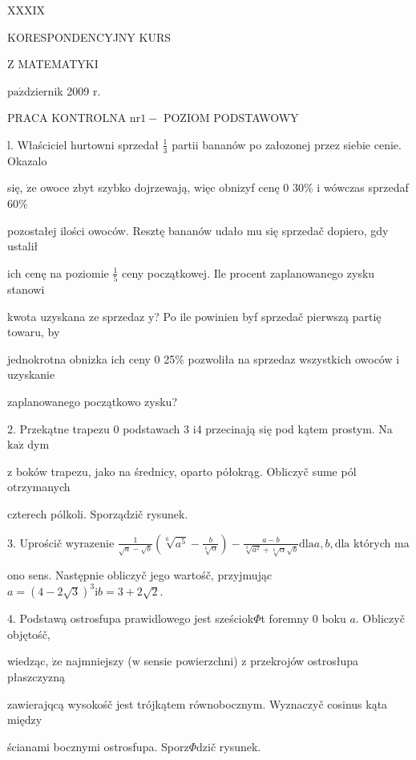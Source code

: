 \documentclass[a4paper,12pt]{article}
\begin{document}
XXXIX

KORESPONDENCYJNY KURS

Z MATEMATYKI

$\mathrm{p}\mathrm{a}\acute{\mathrm{z}}$dziernik 2009 $\mathrm{r}.$

PRACA KONTROLNA $\mathrm{n}\mathrm{r} 1-$ POZIOM PODSTAWOWY

l. Właściciel hurtowni sprzedał $\displaystyle \frac{1}{3}$ partii bananów po załozonej przez siebie cenie. Okazalo

się, $\dot{\mathrm{z}}\mathrm{e}$ owoce zbyt szybko dojrzewają, więc obnizyf cenę $0$ 30\% $\mathrm{i}$ wówczas sprzedaf 60\%

pozostałej ilości owoców. Resztę bananów udało mu się sprzedač dopiero, gdy ustalił

ich cenę na poziomie $\displaystyle \frac{1}{5}$ ceny początkowej. Ile procent zaplanowanego zysku stanowi

kwota uzyskana ze sprzedaz $\mathrm{y}$? Po ile powinien byf sprzedač pierwszą partię towaru, by

jednokrotna obnizka ich ceny $0$ 25\% pozwoliła na sprzedaz wszystkich owoców $\mathrm{i}$ uzyskanie

zaplanowanego początkowo zysku?

2. Przekątne trapezu $0$ podstawach 3 $\mathrm{i}4$ przecinają się pod kątem prostym. Na $\mathrm{k}\mathrm{a}\dot{\mathrm{z}}$ dym

$\mathrm{z}$ boków trapezu, jako na średnicy, oparto półokrąg. Obliczyč sume pól otrzymanych

czterech pólkoli. Sporządzič rysunek.

3. Uprościč wyrazenie $\displaystyle \frac{1}{\sqrt{a}-\sqrt{b}}(\sqrt[6]{a^{5}}-\frac{b}{\sqrt[6]{\alpha}}) -\displaystyle \frac{a-b}{\sqrt[3]{a^{2}}+\sqrt[6]{\alpha}\sqrt{b}} \mathrm{d}\mathrm{l}\mathrm{a}a, b, \mathrm{d}\mathrm{l}\mathrm{a}$ których ma

ono sens. Następnie obliczyč jego wartośč, przyjmując $a=(4-2\sqrt{3})^{3}\mathrm{i} b=3+2\sqrt{2}.$

4. Podstawą ostrosfupa prawidlowego jest sześciok$\Phi$t foremny $0$ boku $a$. Obliczyč objętośč,

wiedząc, $\dot{\mathrm{z}}\mathrm{e}$ najmniejszy ($\mathrm{w}$ sensie powierzchni) $\mathrm{z}$ przekrojów ostrosłupa płaszczyzną

zawierajqcą wysokośč jest trójkątem równobocznym. Wyznaczyč cosinus kąta między

ścianami bocznymi ostrosfupa. Sporz$\Phi$dzič rysunek.
\end{document}
